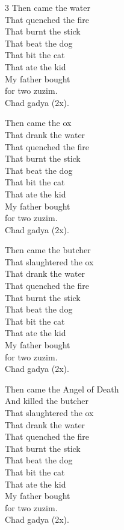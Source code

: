 \documentclass[12pt]{article}
\begin{document}
\begin{minipage}[t]{\textwidth}
\begin{multicols}{3}
Then came the water \\
That quenched the fire \\
That burnt the stick \\
That beat the dog \\
That bit the cat \\
That ate the kid \\
My father bought \\
for two zuzim. \\
Chad gadya (2x).

Then came the ox \\
That drank the water \\
That quenched the fire \\
That burnt the stick \\
That beat the dog \\
That bit the cat \\
That ate the kid \\
My father bought \\
for two zuzim. \\
Chad gadya (2x).

Then came the butcher \\
That slaughtered the ox \\
That drank the water \\
That quenched the fire \\
That burnt the stick \\
That beat the dog \\
That bit the cat \\
That ate the kid \\
My father bought \\
for two zuzim. \\
Chad gadya (2x).

Then came the Angel of Death \\
And killed the butcher \\
That slaughtered the ox \\
That drank the water \\
That quenched the fire \\
That burnt the stick \\
That beat the dog \\
That bit the cat \\
That ate the kid \\
My father bought \\
for two zuzim. \\
Chad gadya (2x).


\end{multicols}
\end{minipage}
\end{document}
